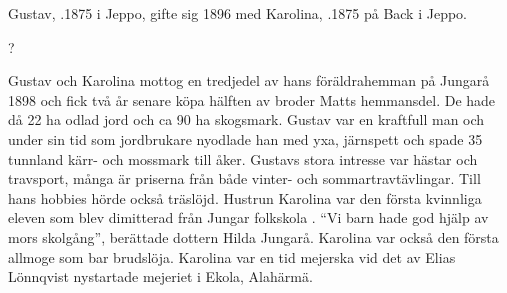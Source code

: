 Gustav, .1875 i Jeppo, gifte sig 1896 med Karolina, .1875 på Back i Jeppo.
\begin{jhchildren}
  \item {}
  \item {}?
  \item {}
  \item {}
  \item {}
  \item {}
  \item {}
  \item {}
  \item {}
  \item {}
  \item {}
\end{jhchildren}
Gustav och Karolina mottog en tredjedel av hans föräldrahemman 	på Jungarå 1898 och fick två år senare köpa hälften av broder Matts 	hemmansdel. De hade då 22 ha odlad jord och ca 90 ha skogsmark. Gustav var en kraftfull man och under sin tid som jordbrukare nyodlade han med yxa, järnspett och spade 35 tunnland kärr- och mossmark till åker. Gustavs stora intresse var hästar och travsport, många är priserna från både vinter- och sommartravtävlingar. Till hans hobbies hörde också träslöjd. Hustrun Karolina var den första kvinnliga eleven som blev dimitterad från Jungar folkskola . ``Vi barn 	hade god hjälp av mors skolgång'', berättade dottern Hilda Jungarå. Karolina var också den första allmoge som bar brudslöja. Karolina var en tid mejerska vid det av Elias Lönnqvist nystartade mejeriet i Ekola, Alahärmä.

